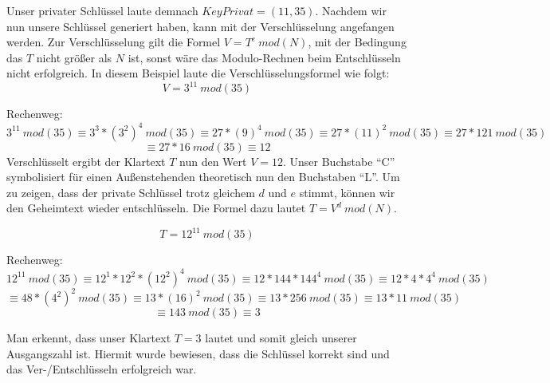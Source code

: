 Unser privater Schlüssel laute demnach $KeyPrivat = (11,35)$.
\newline\newline
Nachdem wir nun unsere Schlüssel generiert haben, kann mit der Verschlüsselung
angefangen werden. Zur Verschlüsselung gilt die Formel $V = T^e \ mod(N)$, mit
der Bedingung das $T$ nicht größer als $N$ ist, sonst wäre das Modulo-Rechnen
beim Entschlüsseln nicht erfolgreich.
In diesem Beispiel laute die Verschlüsselungsformel wie folgt:
\begin{displaymath}
V = 3^{11} \ mod(35)
\end{displaymath}

Rechenweg:
\begin{displaymath}
3^{11} \ mod(35)
\equiv 3^3 *(3^2)^4 \ mod(35)
\equiv 27 * (9)^4 \ mod(35)
\equiv 27 * (11)^2 \ mod(35)
\equiv 27 * 121 \ mod(35)
\end{displaymath}
\begin{displaymath}
\equiv 27 * 16 \ mod(35)
\equiv 12
\end{displaymath}
\newline
Verschlüsselt ergibt der Klartext $T$ nun den Wert $V = 12$. Unser Buchstabe
"`C"' symbolisiert für einen Außenstehenden theoretisch nun den
Buchstaben "`L"'.
\newline\newline
Um zu zeigen, dass der private Schlüssel trotz gleichem $d$ und $e$ stimmt,
können wir den Geheimtext wieder entschlüsseln.
Die Formel dazu lautet $T = V^d \ mod(N)$.

\begin{displaymath}
T = 12^{11} \ mod(35)
\end{displaymath}

Rechenweg:
\begin{displaymath}
12^{11} \ mod(35)
\equiv 12^1 * 12^2 * (12^2)^4 \ mod(35)
\equiv 12*144*144^4 \ mod(35)
\equiv 12*4*4^4 \ mod(35)
\end{displaymath}
\begin{displaymath}
\equiv 48*(4^2)^2 \ mod(35)
\equiv 13*(16)^2 \ mod(35)
\equiv 13*256 \ mod(35)
\equiv 13*11 \ mod(35)
\end{displaymath}
\begin{displaymath}
\equiv 143 \ mod(35)
\equiv 3
\end{displaymath}

Man erkennt, dass unser Klartext $T = 3$ lautet und somit gleich unserer
Ausgangszahl ist. Hiermit wurde bewiesen, dass die Schlüssel korrekt sind und
das Ver-/Entschlüsseln erfolgreich war.

